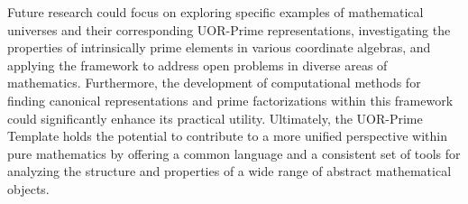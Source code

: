\documentclass{article}
\begin{document}
Future research could focus on exploring specific examples of mathematical universes and their corresponding UOR-Prime representations, investigating the properties of intrinsically prime elements in various coordinate algebras, and applying the framework to address open problems in diverse areas of mathematics. Furthermore, the development of computational methods for finding canonical representations and prime factorizations within this framework could significantly enhance its practical utility. Ultimately, the UOR-Prime Template holds the potential to contribute to a more unified perspective within pure mathematics by offering a common language and a consistent set of tools for analyzing the structure and properties of a wide range of abstract mathematical objects.
\end{document}
